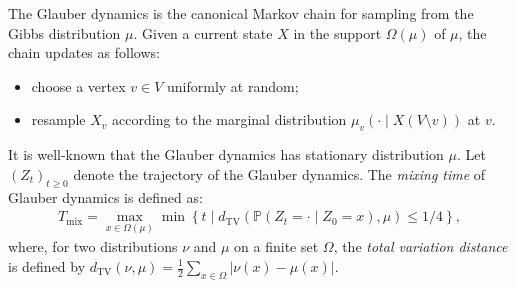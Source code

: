 \documentclass[11pt,a4paper]{article}
\theoremstyle{plain}
\renewcommand{\Pr}{\mathbb{P}}
\begin{document}
The Glauber dynamics is the canonical Markov chain for sampling from the Gibbs distribution $\mu$.
Given a current state $X$ in the support $\Omega(\mu)$ of $\mu$, the chain updates as follows:
\begin{itemize}
\item choose a vertex $v \in V$ uniformly at random;
\item resample $X_v$ according to the marginal distribution $\mu_v(\cdot \mid X(V \setminus {v}))$ at $v$.
\end{itemize}
It is well-known that the Glauber dynamics has stationary distribution $\mu$.
Let $(Z_t)_{t \geq 0}$ denote the trajectory of the Glauber dynamics.
The \emph{mixing time} of Glauber dynamics is defined as:
\begin{align*}
    T_{\mathrm{mix}} = \max_{x \in \Omega(\mu)}\min\left\{t \mid d_{\mathrm{TV}}(\Pr(Z_t = \cdot \mid Z_0 = x),\mu) \leq 1/4\right\},
\end{align*}
where, for two distributions $\nu$ and $\mu$ on a finite set $\Omega$, the \emph{total variation distance} is defined by
    $d_{\mathrm{TV}}(\nu,\mu) = \frac{1}{2} \sum_{x \in \Omega} \left|\nu(x) - \mu(x)\right|$.
\end{document}
